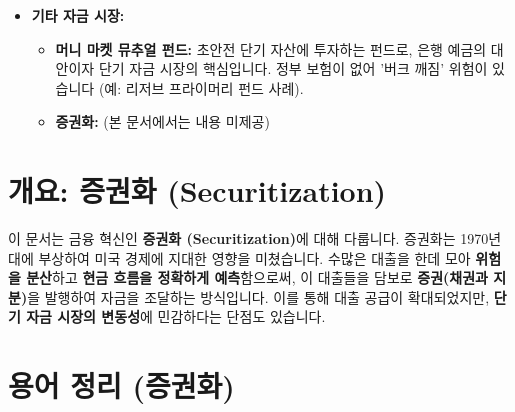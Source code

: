 \documentclass[11pt,a4paper]{book}
\theoremstyle{definition}
\begin{document}
\begin{summarybox}[title=\textbf{모듈 1 핵심 요약: 금리 및 금융 시장}]
\begin{itemize}
\begin{itemize}
        \item \textbf{우상향 곡선:} 경제 확장 및 금리 인상 기대.
        \item \textbf{역전된 곡선:} 경기 침체 및 금리 인하 기대의 강력한 예측 지표.
    \end{itemize}
    \item \textbf{기타 자금 시장:}
    \begin{itemize}
        \item \textbf{머니 마켓 뮤추얼 펀드:} 초안전 단기 자산에 투자하는 펀드로, 은행 예금의 대안이자 단기 자금 시장의 핵심입니다. 정부 보험이 없어 '버크 깨짐' 위험이 있습니다 (예: 리저브 프라이머리 펀드 사례).
        \item \textbf{증권화:} (본 문서에서는 내용 미제공)
    \end{itemize}
\end{itemize}
\end{summarybox}


\section{개요: 증권화 (Securitization)}

\begin{tcolorbox}[
    colback=lightblue,
    colframe=darkblue,
    title=\textbf{문서 핵심 요약}
]
  이 문서는 금융 혁신인 \textbf{증권화 (Securitization)}에 대해 다룹니다.
  증권화는 1970년대에 부상하여 미국 경제에 지대한 영향을 미쳤습니다.
  수많은 대출을 한데 모아 \textbf{위험을 분산}하고 \textbf{현금 흐름을 정확하게 예측}함으로써,
  이 대출들을 담보로 \textbf{증권(채권과 지분)}을 발행하여 자금을 조달하는 방식입니다.
  이를 통해 대출 공급이 확대되었지만, \textbf{단기 자금 시장의 변동성}에 민감하다는 단점도 있습니다.
\end{tcolorbox}


\section{용어 정리 (증권화)}
\end{document}
